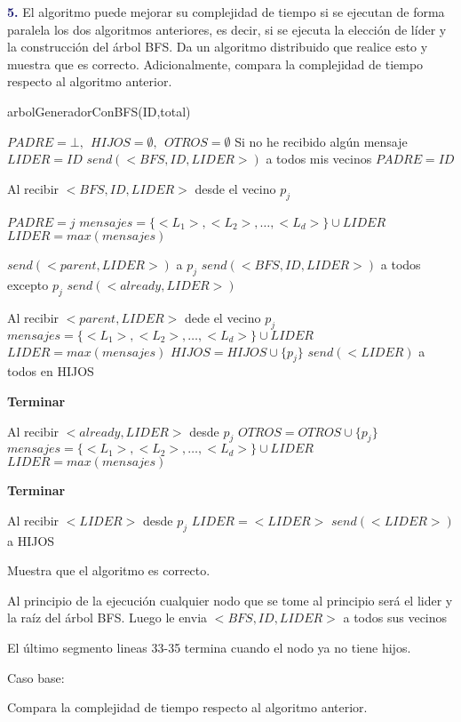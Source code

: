 \newpage
\textbf{\textcolor{MidnightBlue}{5.}} El algoritmo puede mejorar su complejidad de tiempo si se ejecutan de forma paralela
los dos algoritmos anteriores, es decir, si se ejecuta la elección de líder y la construcción del árbol BFS. Da un algoritmo distribuido que realice esto y muestra que es correcto. Adicionalmente, compara la complejidad de tiempo respecto al algoritmo anterior.

\begin{algorithm}
    \caption{arbolGeneradorConBFS(ID,total)}\label{alg:cap}
    \begin{algorithmic}[1]
        \State $PADRE = \bot, \ \ HIJOS = \emptyset, \ \ OTROS = \emptyset$
        \State Si no he recibido algún mensaje
            \State $LIDER = ID$ 
            \State $send(<BFS,ID,LIDER>)$ a todos mis vecinos
            \State $PADRE = ID$
        \EndIf 


        \State Al recibir $<BFS,ID, LIDER>$ desde el vecino $p_j$

            \State $PADRE = j$
            \State $mensajes=\{<L_1>,<L_2>,\dots,<L_d>\} \cup LIDER$
            \State $LIDER = max(mensajes)$
            
            \State $send(<parent,LIDER>)$ a $p_j$
            \State $send(<BFS,ID, LIDER>)$ a todos excepto $p_j$
        \Else
            \State $send(<already, LIDER>)$
        \EndIf


        \State Al recibir $<parent,LIDER>$ dede el vecino $p_j$
        \State $mensajes=\{<L_1>,<L_2>,\dots,<L_d>\} \cup LIDER$
        \State $LIDER = max(mensajes)$
        \State $HIJOS = HIJOS \cup \{p_j\}$
        \State $send(<LIDER)$ a todos en HIJOS

            \State \textbf{Terminar}
        \EndIf

        \State Al recibir $<already, LIDER>$ desde $p_j$
        \State $OTROS = OTROS \cup \{p_j\}$
        \State $mensajes=\{<L_1>,<L_2>,\dots,<L_d>\} \cup LIDER$
        \State $LIDER = max(mensajes)$

            \State \textbf{Terminar}
        \EndIf

        \State Al recibir $<LIDER>$ desde $p_j$
        \State $LIDER = <LIDER>$
        \State $send(<LIDER>)$ a HIJOS

    \end{algorithmic}
\end{algorithm}    


Muestra que el algoritmo es correcto.

Al principio de la ejecución cualquier nodo que se tome al principio será el lider y la raíz del árbol BFS. Luego le envia $<BFS,ID,LIDER>$ a todos sus vecinos 

El último segmento lineas 33-35 termina cuando el nodo ya no tiene hijos.

Caso base:





Compara la complejidad de tiempo respecto al algoritmo anterior.